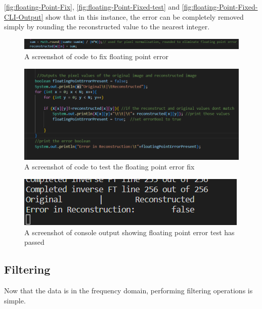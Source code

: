     \autoref{fig:floating-Point-Fix}, \autoref{fig:floating-Point-Fixed-test} and \autoref{fig:floating-Point-Fixed-CLI-Output} show that in this instance, the error can be completely removed simply by rounding the reconstructed value to the nearest integer.
    \newpage
    \begin{figure}[H]
        \centering
        \includegraphics[width=1\columnwidth]{Figures/Week 1/W1-SimpleFT-InverseDFT-Floating-Point-Fix.png}
        \caption{A screenshot of code to fix floating point error}
        \label{fig:floating-Point-Fix}
    \end{figure}
    \begin{figure}[H]
            \centering
            \includegraphics[width=1\columnwidth]{Figures/Week 1/W1-SimpleFT-InverseDFT-Test-2.0-code.png}
            \caption{A screenshot of code to test the floating point error fix}
            \label{fig:floating-Point-Fixed-test}
        \end{figure}   
    \begin{figure}[H]
            \centering
            \includegraphics[width=0.8\columnwidth]{Figures/Week 1/W1-SimpleFT-InverseDFT-Test-2.0-CLI-Output.png}
            \caption{A screenshot of console output showing floating point error test has passed}
            \label{fig:floating-Point-Fixed-CLI-Output}
        \end{figure}
        
   
    \newpage
    \subsection{Filtering}
    Now that the data is in the frequency domain, performing filtering operations is simple. 
    
